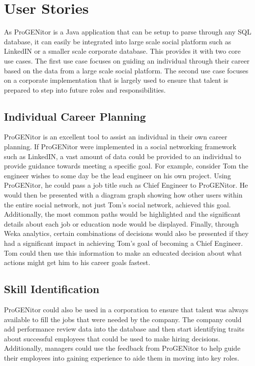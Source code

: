\section{User Stories}
\label{sect:user-stories}
	As ProGENitor is a Java application that can be setup to parse through any SQL
database, it can easily be integrated into large scale social platform such as
LinkedIN or a smaller scale corporate database.  This provides it with two core
use cases.  The first use case focuses on guiding an individual through their
career based on the data from a large scale social platform.  The second use
case focuses on a corporate implementation that is largely used to ensure that talent is
prepared to step into future roles and responsibilities.
\subsection{Individual Career Planning}
		ProGENitor is an excellent tool to assist an individual in their own career
	planning.  If ProGENitor were implemented in a social networking framework such
	as LinkedIN, a vast amount of data could be provided to an individual to
	provide guidance towards meeting a specific goal.  For example, consider Tom
	the engineer wishes to some day be the lead engineer on his own project.  Using
	ProGENitor, he could pass a job title such as Chief Engineer to ProGENitor.  He
	would then be presented with a diagram graph showing how other users within
	the entire social network, not just Tom's social network, achieved this goal. 
	Additionally, the most common paths would be highlighted and the significant
	details about each job or education node would be displayed.  Finally,
	through Weka analytics, certain combinations of decisions would also be
	presented if they had a significant impact in achieving Tom's goal of
	becoming a Chief Engineer.  Tom could then use this information to make an
	educated decision about what actions might get him to his career goals fastest.
\subsection{Skill Identification}
		ProGENitor could also be used in a corporation to ensure that talent was
	always available to fill the jobs that were needed by the company.  The company
	could add performance review data into the database and then start identifying
	traits about successful employees that could be used to make hiring decisions. 
	Additionally, managers could use the feedback from ProGENitor to help guide
	their employees into gaining experience to aide them in moving into key roles. 
	
